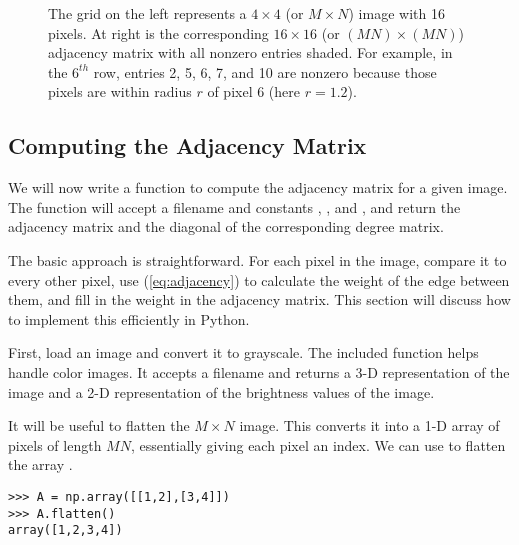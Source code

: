 \begin{figure}

\caption{The grid on the left represents a $4\times4$ (or $M \times N$) image with 16 pixels. 
At right is the corresponding $16 \times 16$ (or $(MN) \times (MN)$) adjacency matrix with all nonzero entries shaded.
For example, in the $6^{th}$ row, entries 2, 5, 6, 7, and 10 are nonzero because those pixels are within radius $r$ of pixel 6 (here $r = 1.2$).}
\label{fig:adjacency}
\end{figure}


\subsection*{Computing the Adjacency Matrix}
We will now write a function to compute the adjacency matrix for a given image.
The function will accept a filename and constants , , and , and return the adjacency matrix and the diagonal of the corresponding degree matrix. 

The basic approach is straightforward. 
For each pixel in the image, compare it to every other pixel, use (\ref{eq:adjacency}) to calculate the weight of the edge between them, and fill in the weight in the adjacency matrix.
This section will discuss how to implement this efficiently in Python.

First, load an image and convert it to grayscale. 
The included function  helps handle color images.
It accepts a filename and returns a 3-D representation of the image and a 2-D representation of the brightness values of the image.

It will be useful to flatten the $M \times N$ image.
This converts it into a 1-D array of pixels of length $MN$, essentially giving each pixel an index. 
We can use  to flatten the array .
\begin{lstlisting}
>>> A = np.array([[1,2],[3,4]])
>>> A.flatten()                
array([1,2,3,4])
\end{lstlisting}

